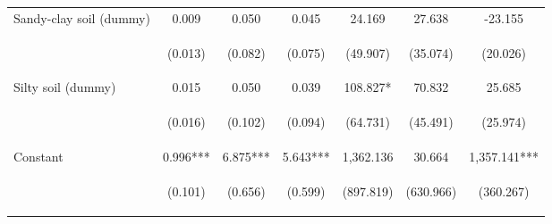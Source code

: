 \begin{center}
\begin{tabular}{lcccccc}
Sandy-clay soil (dummy) & 0.009 & 0.050 & 0.045 & 24.169 & 27.638 & -23.155 \\
\vspace{4pt} & \begin{footnotesize}(0.013)\end{footnotesize} & \begin{footnotesize}(0.082)\end{footnotesize} & \begin{footnotesize}(0.075)\end{footnotesize} & \begin{footnotesize}(49.907)\end{footnotesize} & \begin{footnotesize}(35.074)\end{footnotesize} & \begin{footnotesize}(20.026)\end{footnotesize} \\
Silty soil (dummy) & 0.015 & 0.050 & 0.039 & 108.827* & 70.832 & 25.685 \\
\vspace{4pt} & \begin{footnotesize}(0.016)\end{footnotesize} & \begin{footnotesize}(0.102)\end{footnotesize} & \begin{footnotesize}(0.094)\end{footnotesize} & \begin{footnotesize}(64.731)\end{footnotesize} & \begin{footnotesize}(45.491)\end{footnotesize} & \begin{footnotesize}(25.974)\end{footnotesize} \\
Constant & 0.996*** & 6.875*** & 5.643*** & 1,362.136 & 30.664 & 1,357.141*** \\
 & \begin{footnotesize}(0.101)\end{footnotesize} & \begin{footnotesize}(0.656)\end{footnotesize} & \begin{footnotesize}(0.599)\end{footnotesize} & \begin{footnotesize}(897.819)\end{footnotesize} & \begin{footnotesize}(630.966)\end{footnotesize} & \begin{footnotesize}(360.267)\end{footnotesize} \\

\end{tabular}
\end{center}
